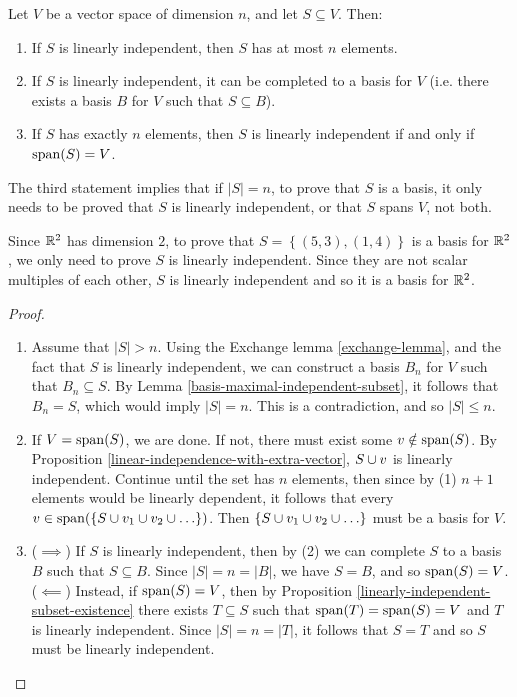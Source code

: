 \begin{cor}\label{basis-span-independence}
    Let $V$ be a vector space of dimension $n$, and let $S \subseteq V$. Then:
    \begin{enumerate}
        \item If $S$ is linearly independent, then $S$ has at most $n$ elements.
        \item If $S$ is linearly independent, it can be completed to a basis for $V$ (i.e. there exists a basis $B$ for $V$ such that $S \subseteq B$).
        \item If $S$ has exactly $n$ elements, then $S$ is linearly independent if and only if $\operatorname{span}(S) = V$.
    \end{enumerate}
\end{cor}

\begin{rmk}
    The third statement implies that if $|S| = n$, to prove that $S$ is a basis, it only needs to be proved that $S$ is linearly independent, or that $S$ spans $V$, not both.
\end{rmk}

\begin{exmp}
    Since $\mathbb{R}^2$ has dimension $2$, to prove that $S = \left\{(5, 3), (1, 4)\right\}$ is a basis for $\mathbb{R}^2$, we only need to prove $S$ is linearly independent. Since they are not scalar multiples of each other, $S$ is linearly independent and so it is a basis for $\mathbb{R}^2$.
\end{exmp}

\begin{proof}\proofbreak
    \begin{enumerate}
        \item Assume that $|S| > n$. Using the Exchange lemma \ref{exchange-lemma}, and the fact that $S$ is linearly independent, we can construct a basis $B_n$ for $V$ such that $B_n \subseteq S$. By Lemma \ref{basis-maximal-independent-subset}, it follows that $B_n = S$, which would imply $|S| = n$. This is a contradiction, and so $|S| \leq n$.
        \item If $V = \operatorname{span}(S)$, we are done. If not, there must exist some $v \notin \operatorname{span}(S)$. By Proposition \ref{linear-independence-with-extra-vector}, $S \cup v$ is linearly independent. Continue until the set has $n$ elements, then since by (1) $n+1$ elements would be linearly dependent, it follows that every $v \in \operatorname{span}(\{S \cup v_1 \cup v_2 \cup \ldots\})$. Then $\{S \cup v_1 \cup v_2 \cup \ldots\}$ must be a basis for $V$.
        \item ($\implies$) If $S$ is linearly independent, then by (2) we can complete $S$ to a basis $B$ such that $S \subseteq B$. Since $|S| = n = |B|$, we have $S = B$, and so $\operatorname{span}(S) = V$. \\ ($\impliedby$) Instead, if $\operatorname{span}(S) = V$, then by Proposition \ref{linearly-independent-subset-existence} there exists $T \subseteq S$ such that $\operatorname{span}(T) = \operatorname{span}(S) = V$ and $T$ is linearly independent. Since $|S| = n = |T|$, it follows that $S = T$ and so $S$ must be linearly independent.
    \end{enumerate}
\end{proof}

